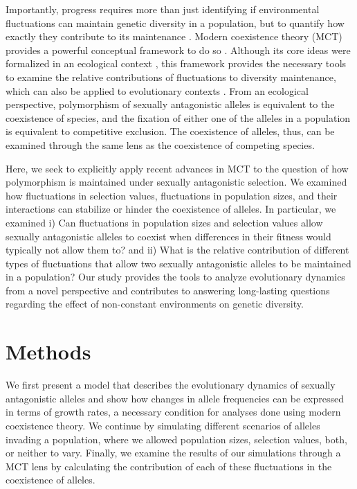 \documentclass[12pt]{article}
\begin{document}
Importantly, progress requires more than just identifying if environmental fluctuations can maintain genetic diversity in a population, but to quantify how exactly they contribute to its maintenance \citep{ellner2016quantify}. Modern coexistence theory (MCT) provides a powerful conceptual framework to do so \citep{Chesson2000,chesson1994multispecies, barabas_chessons_2018}. Although its core ideas were formalized in an ecological context \citep{chesson1994multispecies,chesson2000general}, this framework provides the necessary tools to examine the relative contributions of fluctuations to diversity maintenance, which can also be applied to evolutionary contexts  \citep{ellner1996patterns,reinhold2000maintenance}. From an ecological perspective, polymorphism of sexually antagonistic alleles is equivalent to the coexistence of species, and the fixation of either one of the alleles in a population is equivalent to competitive exclusion. The coexistence of alleles, thus, can be examined through the same lens as the coexistence of competing species.

Here, we seek to explicitly apply recent  advances in MCT to the question of how
polymorphism is maintained under sexually antagonistic selection.  We examined how fluctuations in selection values, fluctuations in population sizes, and their interactions can stabilize or hinder the coexistence of alleles. In particular, we examined  i) Can fluctuations in population sizes and selection values allow sexually antagonistic alleles to coexist when differences in their fitness would typically not allow them to? and ii) What is the relative contribution of different types of fluctuations that allow two sexually antagonistic alleles to be maintained in a population? Our study provides the tools to analyze evolutionary dynamics from a novel perspective and contributes to answering long-lasting questions regarding the effect of non-constant environments on genetic diversity.



\section{Methods}

We first present  a model that describes the evolutionary dynamics of sexually antagonistic alleles and show how changes in allele frequencies can be expressed in terms of growth rates, a necessary condition for analyses done using modern coexistence theory. We continue by simulating different scenarios of alleles invading a population, where we allowed population sizes, selection values, both, or neither to vary. Finally, we examine the results of our simulations through a MCT lens by calculating the contribution of each of these fluctuations in the coexistence of alleles.
\end{document}
